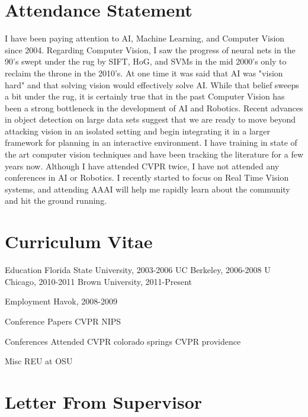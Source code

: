 \documentclass[12pt]{article}
\numberwithin{equation}{section}
\numberwithin{table}{section}
\numberwithin{figure}{section}
\begin{document}
\newpage

\section{Attendance Statement}
  I have been paying attention to AI, Machine Learning, and Computer Vision since 2004. 
Regarding Computer Vision, I saw the progress of neural nets in the 90's swept under 
the rug by SIFT, HoG, and SVMs in the mid 2000's only to reclaim the throne in the 2010's.
At one time it was said that AI was "vision hard" and that solving vision would
effectively solve AI. While that belief sweeps a bit under the rug, it is certainly true
that in the past Computer Vision has been a strong bottleneck in the development of AI and 
Robotics. 
  Recent advances in object detection on large data sets suggest that we are ready
to move beyond attacking vision in an isolated setting and begin integrating it in a
larger framework for planning in an interactive environment. I have training in state
of the art computer vision techniques and have been tracking the literature for a few
years now. Although I have attended CVPR twice, I have not attended any conferences in
AI or Robotics.  I recently started to focus on Real Time Vision systems, and attending AAAI
will help me rapidly learn about the community and hit the ground running.

\newpage

\section{Curriculum Vitae}
Education
Florida State University, 2003-2006
UC Berkeley, 2006-2008
U Chicago, 2010-2011
Brown University, 2011-Present

Employment
Havok, 2008-2009

Conference Papers
CVPR
NIPS

Conferences Attended
CVPR colorado springs
CVPR providence

Misc
REU at OSU


\newpage

\section{Letter From Supervisor}

\newpage
\end{document}
